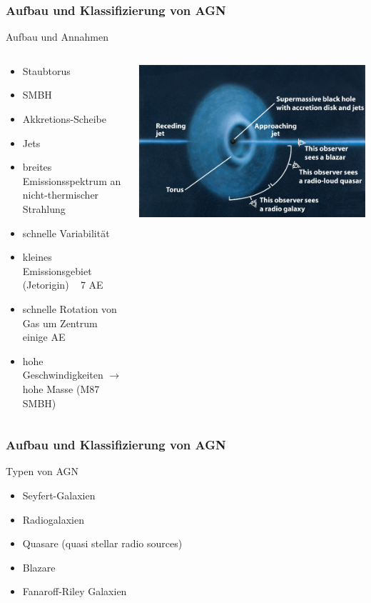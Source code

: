 \documentclass[aspectratio=1610, 9pt]{beamer}
\begin{document}
\begin{frame}\frametitle{Aufbau und Klassifizierung von AGN}
  \begin{block}{Aufbau und Annahmen}
  \begin{columns}
  \begin{column}[c]{0.45\textwidth}
  \begin{itemize}
    \item Staubtorus
    \item SMBH
    \item Akkretions-Scheibe
    \item Jets
    \item breites Emissionsspektrum an nicht-thermischer Strahlung
    \item schnelle Variabilit\"at
    \item kleines Emissionsgebiet (Jetorigin) ~ 7 AE
    \item schnelle Rotation von Gas um Zentrum ~ einige AE
    \item hohe Geschwindigkeiten $\to$ hohe Masse (M87 SMBH)
  \end{itemize}
  \end{column}
  \begin{column}[c]{0.45\textwidth}
    \includegraphics{images/agn-pic.png}
  \end{column}
  \end{columns}
  \end{block}
\end{frame}

\begin{frame}\frametitle{Aufbau und Klassifizierung von AGN}
  \begin{block}{Typen von AGN}
    \begin{itemize}
      \item Seyfert-Galaxien
      \item Radiogalaxien
      \item Quasare (quasi stellar radio sources)
      \item Blazare
      \item Fanaroff-Riley Galaxien
    \end{itemize}
  \end{block}
\end{frame}
\end{document}
